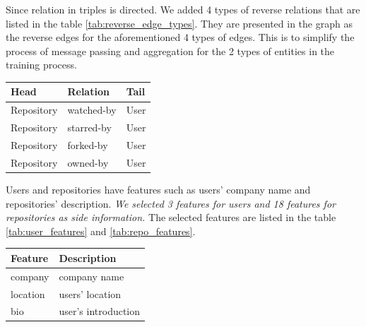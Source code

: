 \documentclass[11pt,twoside]{report}
\begin{document}
Since relation in triples is directed. We added 4 types of reverse relations that are listed in the table \ref{tab:reverse_edge_types}. They are presented in the graph as the reverse edges for the aforementioned 4 types of edges. This is to simplify the process of message passing and aggregation for the 2 types of entities in the training process.

\begin{center}
    \begin{tabular}{l | l | l}
    \hline
    Head & Relation & Tail \\
    \hline
    Repository & watched-by & User \\
    Repository & starred-by & User \\
    Repository & forked-by & User \\
    Repository & owned-by & User \\
    \end{tabular}
    \label{tab:reverse_edge_types}
\end{center}

Users and repositories have features such as users' company name and repositories' description. \textit{We selected 3 features for users and 18 features for repositories as side information.} The selected features are listed in the table \ref{tab:user_features} and \ref{tab:repo_features}.

\begin{center}
    \begin{tabular}{l | l}
    \hline
    Feature & Description \\
    \hline
    company & company name \\
    location & users' location \\
    bio & user's introduction \\
    \end{tabular}
    \label{tab:user_features}
\end{center}
\end{document}
